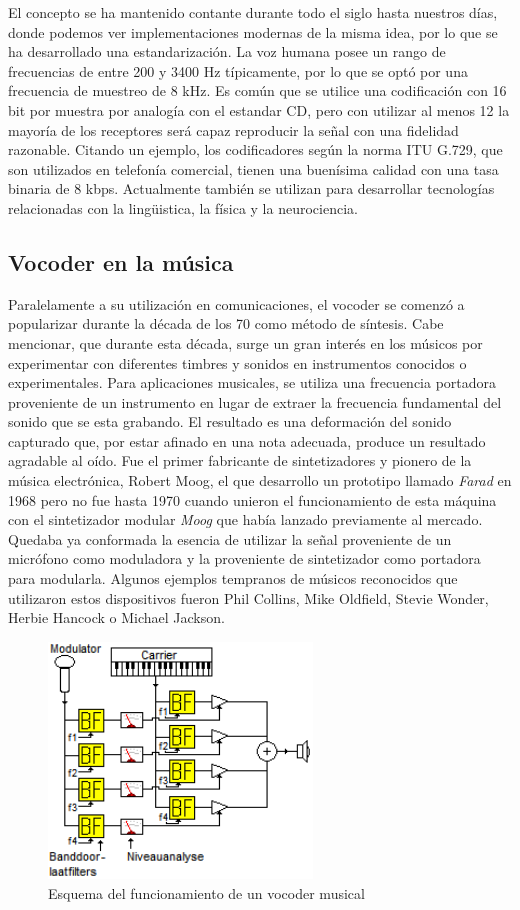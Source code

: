 El concepto se ha mantenido contante durante todo el siglo hasta nuestros días, donde podemos ver implementaciones modernas de la misma idea, por lo que se ha desarrollado una estandarización. La voz humana posee un rango de frecuencias de entre 200 y 3400 Hz típicamente, por lo que se optó por una frecuencia de muestreo de 8 kHz. Es común que se utilice una codificación con 16 bit por muestra por analogía con el estandar CD, pero con utilizar al menos 12 la mayoría de los receptores será capaz reproducir la señal con una fidelidad razonable. Citando un ejemplo, los codificadores según la norma ITU G.729, que son utilizados en telefonía comercial, tienen una buenísima calidad con una tasa binaria de 8 kbps. Actualmente también se utilizan para desarrollar tecnologías relacionadas con la lingüistica, la física y la neurociencia.

\subsection{Vocoder en la música}
Paralelamente a su utilización en comunicaciones, el vocoder se comenzó a popularizar durante la década de los 70 como método de síntesis. Cabe mencionar, que durante esta década, surge un gran interés en los músicos por experimentar con diferentes timbres y sonidos en instrumentos conocidos o experimentales. Para aplicaciones musicales, se utiliza una frecuencia portadora proveniente de un instrumento en lugar de extraer la frecuencia fundamental del sonido que se esta grabando. El resultado es una deformación del sonido capturado que, por estar afinado en una nota adecuada, produce un resultado agradable al oído. Fue el primer fabricante de sintetizadores y pionero de la música electrónica, Robert Moog, el que desarrollo un prototipo llamado \emph{Farad} en 1968 pero no fue hasta 1970 cuando unieron el funcionamiento de esta máquina con el sintetizador modular \emph{Moog} que había lanzado previamente al mercado. Quedaba ya conformada la esencia de utilizar la señal proveniente de un micrófono como moduladora y la proveniente de sintetizador como portadora para modularla. Algunos ejemplos tempranos de músicos reconocidos  que utilizaron estos dispositivos fueron Phil Collins, Mike Oldfield, Stevie Wonder, Herbie Hancock o Michael Jackson.

\begin{figure}
\begin{center}
\includegraphics[width=7cm]{img/music_vocoder.png}
\caption{Esquema del funcionamiento de un vocoder musical}
\end{center}
\end{figure}

